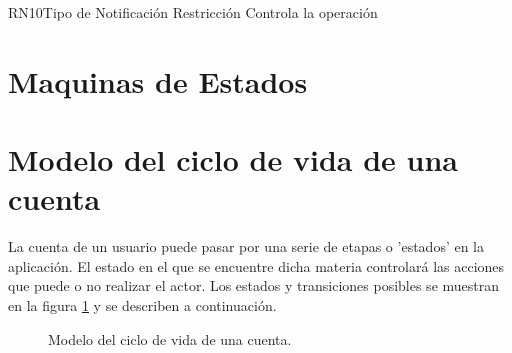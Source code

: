 \begin{BusinessRule}{RN10}{Tipo de Notificación}
	{Restricción}
	{Controla la operación}
\end{BusinessRule}









\newpage
\section{Maquinas de Estados}

\hypertarget{cv:Cuenta}{\section{Modelo del ciclo de vida de una cuenta}}

La cuenta de un usuario puede pasar por una serie de etapas o 'estados' en la aplicación. El estado en el que se encuentre dicha materia controlará las acciones que puede o no realizar el actor. Los estados y transiciones posibles se muestran en la figura \ref{fig:maq:cuenta} y se describen a continuación.\\

\begin{figure}[htbp!]
	\centering
	\caption{Modelo del ciclo de vida de una cuenta.}
	\label{fig:maq:cuenta}
\end{figure}

